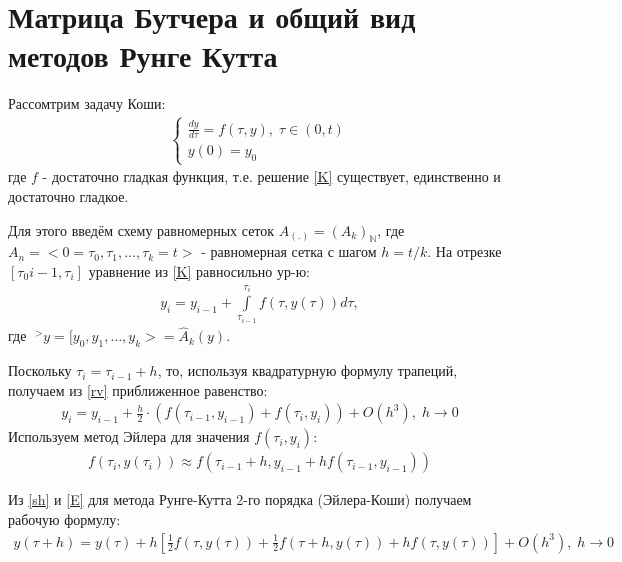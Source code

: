 \documentclass[__main__.tex]{subfiles}
\begin{document}
\section{Матрица Бутчера и общий вид методов Рунге Кутта}

Рассомтрим задачу Коши:
\begin{gather}
	\begin{cases}
		\frac{dy}{d\tau}=f(\tau,y),\; \tau\in(0,t)\\
		y(0)=y_0
	\end{cases}
	\label{K}
\end{gather}
где $f$ - достаточно гладкая функция, т.е. решение \ref{K} существует, единственно и достаточно гладкое.

Для этого введём схему равномерных сеток $A_{(.)}=(A_k)_\mathbb{N}$, где $A_n=<0=\tau_0,\tau_1,\dots,\tau_k=t>$ - равномерная сетка с шагом $h=t/k.$ На отрезке $[\tau_0{i-1},\tau_i]$ уравнение из \ref{K} равносильно ур-ю:
\begin{gather}
	y_i=y_{i-1}+\int\limits_{\tau_{i-1}}^{\tau_i}f(\tau,y(\tau))d\tau,
	\label{rv}
\end{gather}
где $\;^>y=[y_0,y_1,\dots,y_k>=\hat A_k(y).$

Поскольку $\tau_i=\tau_{i-1}+h$, то, используя квадратурную формулу трапеций, получаем из \ref{rv} приближенное равенство:
\begin{gather}
	y_i=y_{i-1}+\frac{h}{2}\cdot\left(f(\tau_{i-1},y_{i-1})+f(\tau_{i},y_{i})\right)+O(h^3),\; h\rightarrow0
	\label{sh}
\end{gather}
Используем метод Эйлера для значения $f(\tau_i,y_i):$
\begin{gather}
	f(\tau_i,y(\tau_i))\approx f(\tau_{i-1}+h,y_{i-1}+hf(\tau_{i-1},y_{i-1}))
	\label{E}
\end{gather}

Из \ref{sh} и \ref{E} для метода Рунге-Кутта 2-го порядка (Эйлера-Коши) получаем рабочую формулу:
\begin{gather}
	y(\tau+h)=y(\tau)+h\left[\frac{1}{2}f(\tau,y(\tau))+\frac{1}{2}f(\tau+h,y(\tau))+hf(\tau,y(\tau))\right]+O(h^3),\; h\rightarrow0
	\label{rk}
\end{gather}
\end{document}
